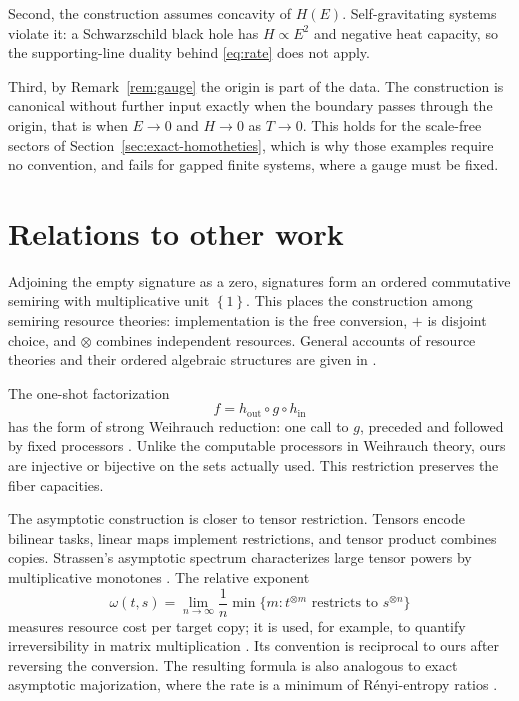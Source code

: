 \documentclass[11pt]{article}
\theoremstyle{definition}
\theoremstyle{remark}
\newcommand{\sig}[1]{\left\{#1\right\}}
\begin{document}
Second, the construction assumes concavity of \(H(E)\).  Self-gravitating
systems violate it: a Schwarzschild black hole has \(H\propto E^2\) and
negative heat capacity, so the supporting-line duality behind
\eqref{eq:rate} does not apply.

Third, by Remark~\ref{rem:gauge} the origin is part of the data.  The
construction is canonical without further input exactly when the boundary
passes through the origin, that is when \(E\to0\) and \(H\to0\) as
\(T\to0\).  This holds for the scale-free sectors of
Section~\ref{sec:exact-homotheties}, which is why those examples require no
convention, and fails for gapped finite systems, where a gauge must be fixed.

\section{Relations to other work}
\label{sec:related}

Adjoining the empty signature as a zero, signatures form an ordered
commutative semiring with multiplicative unit \(\sig{1}\).  This places the
construction among semiring resource theories: implementation is the free
conversion, \(+\) is disjoint choice, and \(\otimes\) combines independent
resources.  General accounts of resource
theories and their ordered algebraic structures are given in
\cite{coecke-fritz-spekkens-2016,fritz-2017}.

The one-shot factorization
\[
  f=h_{\mathrm{out}}\circ g\circ h_{\mathrm{in}}
\]
has the form of strong Weihrauch reduction: one call to \(g\), preceded and
followed by fixed processors \cite{brattka-gherardi-pauly-2021}.  Unlike the
computable processors in Weihrauch theory, ours are injective or bijective on
the sets actually used.  This restriction preserves the fiber capacities.

The asymptotic construction is closer to tensor restriction.  Tensors encode
bilinear tasks, linear maps implement restrictions, and tensor product
combines copies.  Strassen's asymptotic spectrum characterizes large tensor
powers by multiplicative monotones \cite{strassen-1988}.  The relative
exponent
\[
  \omega(t,s)
  =\lim_{n\to\infty}\frac1n
    \min\{m:t^{\otimes m}\text{ restricts to }s^{\otimes n}\}
\]
measures resource cost per target copy; it is used, for example, to quantify
irreversibility in matrix multiplication
\cite{christandl-vrana-zuiddam-2021}.  Its convention is reciprocal to ours
after reversing the conversion.  The resulting formula is also analogous to
exact asymptotic majorization, where the rate is a minimum of R\'enyi-entropy
ratios \cite{jensen-2019}.
\end{document}
